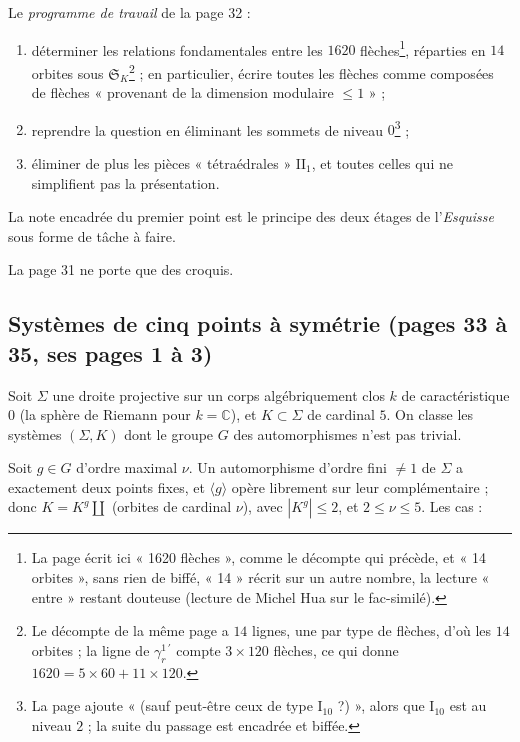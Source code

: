 \documentclass[11pt,a4paper]{article}
\begin{document}
Le \emph{programme de travail} de la page 32 :
\begin{enumerate}
\item déterminer les relations fondamentales entre les $1620$ flèches\footnote{La
page écrit ici « 1620 flèches », comme le décompte qui précède, et « 14 orbites », sans
rien de biffé, « 14 » récrit sur un autre nombre, la lecture « entre » restant douteuse
(lecture de Michel Hua sur le fac-similé).}, réparties en $14$ orbites sous
$\mathfrak{S}_K$\footnote{Le décompte de la même page a $14$ lignes, une par type
de flèches, d'où les $14$ orbites ; la ligne de $\gamma^{1\,\prime}_r$ compte
$3\times 120$ flèches, ce qui donne $1620 = 5\times 60 + 11\times 120$.} ; en particulier, écrire toutes
les flèches comme composées de flèches « provenant de la dimension modulaire
$\leq 1$ » ;
\item reprendre la question en éliminant les sommets de niveau $0$\footnote{La
page ajoute « (sauf peut-être ceux de type $\mathrm{I}_{10}$ ?) », alors que
$\mathrm{I}_{10}$ est au niveau $2$ ; la suite du passage est encadrée et biffée.} ;
\item éliminer de plus les pièces « tétraédrales » $\mathrm{II}_1$, et toutes
celles qui ne simplifient pas la présentation.
\end{enumerate}
La note encadrée du premier point est le principe des deux étages de
l'\emph{Esquisse} sous forme de tâche à faire.

La page 31 ne porte que des croquis.

\subsection*{Systèmes de cinq points à symétrie (pages 33 à 35, ses pages 1 à 3)}

Soit $\Sigma$ une droite projective sur un corps algébriquement clos $k$ de
caractéristique $0$ (la sphère de Riemann pour $k = \mathbb{C}$), et $K \subset
\Sigma$ de cardinal $5$. On classe les systèmes $(\Sigma, K)$ dont le groupe $G$
des automorphismes n'est pas trivial.

Soit $g \in G$ d'ordre maximal $\nu$. Un automorphisme d'ordre fini $\neq 1$ de
$\Sigma$ a exactement deux points fixes, et $\langle g \rangle$ opère librement
sur leur complémentaire ; donc $K = K^{g} \amalg$ (orbites de cardinal $\nu$),
avec $|K^{g}| \leq 2$, et $2 \leq \nu \leq 5$. Les cas :
\end{document}
